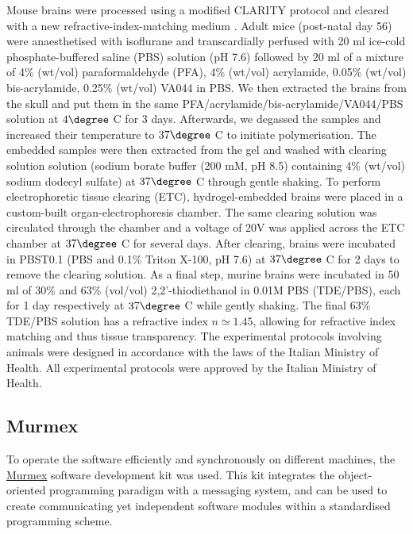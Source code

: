 \documentclass[12pt]{spieman}  %
\begin{document}
\begin{spacing}{2}
Mouse brains were processed using a modified CLARITY protocol \cite{Chung2013} and cleared with a new refractive-index-matching medium \cite{Costantini}. Adult mice (post-natal day 56) were anaesthetised with isoflurane and transcardially perfused with 20 ml ice-cold phosphate-buffered saline (PBS) solution (pH 7.6) followed by 20 ml of a mixture of 4\% (wt/vol) paraformaldehyde (PFA), 4\% (wt/vol) acrylamide, 0.05\% (wt/vol) bis-acrylamide, 0.25\% (wt/vol) VA044 in PBS. We then extracted the brains from the skull and put them in the same PFA/acrylamide/bis-acrylamide/VA044/PBS solution at $4 \degree$ C for 3 days. Afterwards, we degassed the samples and increased their temperature to $37 \degree$ C to initiate polymerisation. The embedded samples were then extracted from the gel and washed with clearing solution solution (sodium borate buffer (200 mM, pH 8.5) containing 4\% (wt/vol) sodium dodecyl sulfate) at $37 \degree $ C through gentle shaking. To perform electrophoretic tissue clearing (ETC), hydrogel-embedded brains were placed in a custom-built organ-electrophoresis chamber. The same clearing solution was circulated through the chamber and a voltage of 20V was applied across the ETC chamber at $37 \degree$ C for several days. After clearing, brains were incubated in PBST0.1 (PBS and 0.1\% Triton X-100, pH 7.6) at $37 \degree$ C for 2 days to remove the clearing solution. As a final step, murine brains were incubated in 50 ml of 30\% and 63\% (vol/vol) 2,2'-thiodiethanol in 0.01M PBS (TDE/PBS), each for 1 day respectively at $37 \degree$ C while gently shaking. The final 63\% TDE/PBS solution has a refractive index $n\simeq 1.45$, allowing for refractive index matching and thus tissue transparency. The experimental protocols involving animals were designed in accordance with the laws of the Italian Ministry of Health. All experimental protocols were approved by the Italian Ministry of Health.



\subsection{Murmex}
\label{sec:murmex}


To operate the software efficiently and synchronously on different machines, the \href{http://sine.ni.com/nips/cds/view/p/lang/en/nid/212895}{Murmex} software development kit was used. This kit integrates the object-oriented programming paradigm with a messaging system, and can be used to create communicating yet independent software modules within a standardised programming scheme.


\end{spacing}
\end{document}
